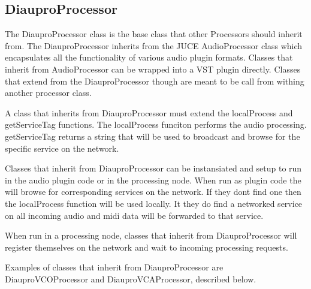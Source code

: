 \subsection{DiauproProcessor}

The DiauproProcessor class is the base class that other Processors should inherit from. The DiauproProcessor inherits from the JUCE AudioProcessor class which encapsulates all the functionality of various audio plugin formats. Classes that inherit from AudioProcessor can be wrapped into a VST plugin directly. Classes that extend from the DiauproProcessor though are meant to be call from withing another processor class.

A class that inherits from DiauproProcessor must extend the localProcess and getServiceTag functions. The localProcess funciton performs the audio processing. getServiceTag returns a string that will be used to broadcast and browse for the specific service on the network.

Classes that inherit from DiauproProcessor can be instansiated and setup to run in the audio plugin code or in the processing node. When run as plugin code the will browse for corresponding services on the network. If they dont find one then the localProcess function will be used locally. It they do find a networked service on all incoming audio and midi data will be forwarded to that service.

When run in a processing node, classes that inherit from DiauproProcessor will register themselves on the network and wait to incoming processing requests.

Examples of classes that inherit from DiauproProcessor are DiauproVCOProcessor and DiauproVCAProcessor, described below.